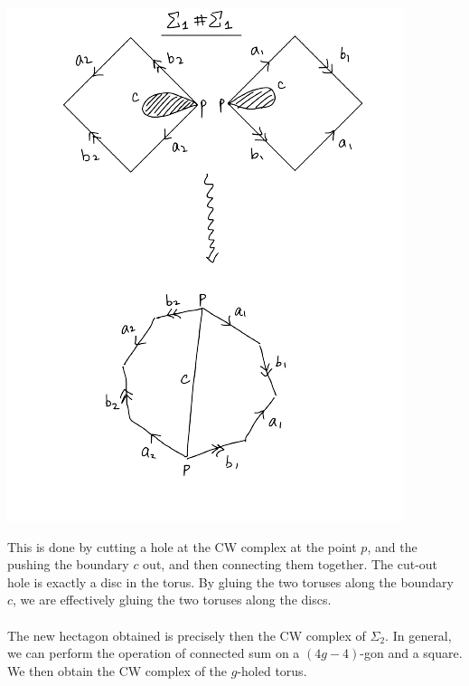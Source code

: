\documentclass[a4paper]{article}
\begin{document}
\begin{center}
\includegraphics[scale = 0.8]{Image 1}
\end{center}

This is done by cutting a hole at the CW complex at the point $p$, and the pushing the boundary $c$ out, and then connecting them together. The cut-out hole is exactly a disc in the torus. By gluing the two toruses along the boundary $c$, we are effectively gluing the two toruses along the discs. \\~\\

The new hectagon obtained is precisely then the CW complex of $\Sigma_2$. In general, we can perform the operation of connected sum on a $(4g-4)$-gon and a square. We then obtain the CW complex of the $g$-holed torus. 
\end{document}
